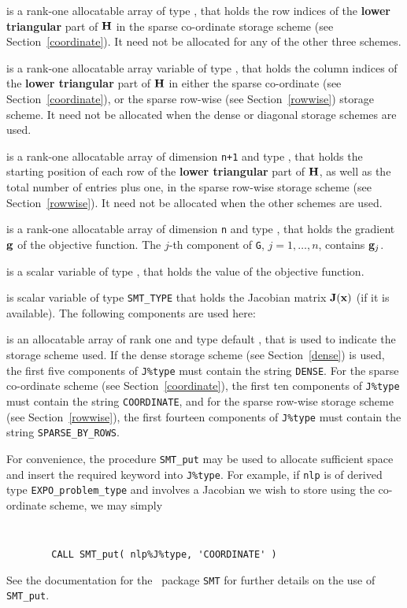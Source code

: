 \documentclass{galahad}
\newcommand{\packagename}{EXPO}
\begin{document}
\begin{description}
\begin{description}
 is a rank-one allocatable array of type \integer,
that holds the row indices of the {\bf lower triangular} part of ${\mathbf{H}}$
in the sparse co-ordinate storage
scheme (see Section~\ref{coordinate}).
It need not be allocated for any of the other three schemes.

 is a rank-one allocatable array variable of type \integer,
that holds the column indices of the {\bf lower triangular} part of
${\mathbf{H}}$ in either the sparse co-ordinate
(see Section~\ref{coordinate}), or the sparse row-wise
(see Section~\ref{rowwise}) storage scheme.
It need not be allocated when the dense or diagonal storage schemes are used.

 is a rank-one allocatable array of dimension {\tt n+1} and type
\integer, that holds the starting position of
each row of the {\bf lower triangular} part of ${\mathbf{H}}$, as well
as the total number of entries plus one, in the sparse row-wise storage
scheme (see Section~\ref{rowwise}). It need not be allocated when the
other schemes are used.

\end{description}

 is a rank-one allocatable array of dimension {\tt n} and type
\realdp, that holds the gradient ${\mathbf{g}}$ of the objective function.
The $j$-th component of {\tt G}, $j = 1,  \ldots ,  n$, contains ${\mathbf{g}}_{j}$.

 is a scalar variable of type
\realdp, that holds the value of the objective function.

 is scalar variable of type {\tt SMT\_TYPE}
that holds the Jacobian matrix ${\mathbf{J}}({\mathbf{x}})$ (if it is available).
The following components are used here:

\begin{description}

 is an allocatable array of rank one and type default
\character, that
is used to indicate the storage scheme used. If the dense storage scheme
(see Section~\ref{dense}) is used,
the first five components of {\tt J\%type} must contain the
string {\tt DENSE}.
For the sparse co-ordinate scheme (see Section~\ref{coordinate}),
the first ten components of {\tt J\%type} must contain the
string {\tt COORDINATE},
and for the sparse row-wise storage scheme (see Section~\ref{rowwise}),
the first fourteen components of {\tt J\%type} must contain the
string {\tt SPARSE\_BY\_ROWS}.

For convenience, the procedure {\tt SMT\_put}
may be used to allocate sufficient space and insert the required keyword
into {\tt J\%type}.
For example, if {\tt nlp} is of derived type {\tt \packagename\_problem\_type}
and involves a Jacobian we wish to store using the co-ordinate scheme,
we may simply
{\tt
\begin{verbatim}
        CALL SMT_put( nlp%J%type, 'COORDINATE' )
\end{verbatim}
}
\noindent
See the documentation for the \galahad\ package {\tt SMT}
for further details on the use of {\tt SMT\_put}.


\end{description}
\end{description}
\end{document}
